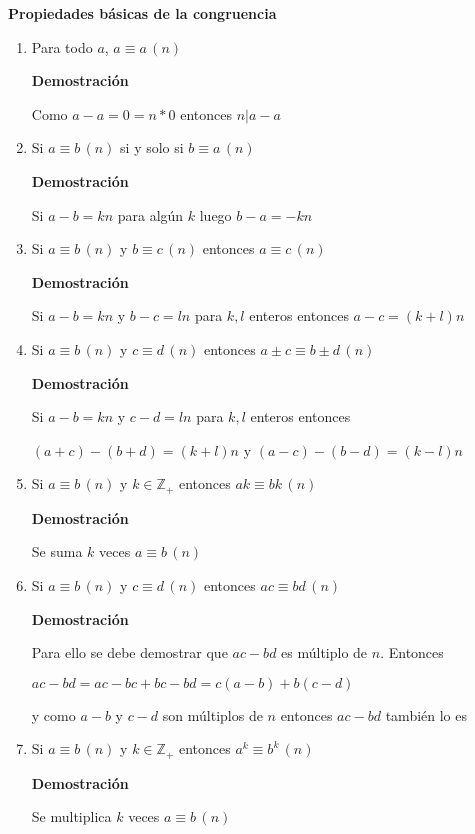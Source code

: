\documentclass[a4paper,12pt]{report}
\begin{document}
\textbf{Propiedades básicas de la congruencia}
\begin{enumerate}
 \item Para todo $a$, $a \equiv a \, (n)$
 
 \textbf{Demostración}
 
 Como $a-a = 0 = n*0$ entonces $n|a-a$
 
 \item Si $a \equiv b \, (n)$ si y solo si $b \equiv a \, (n)$
 
 \textbf{Demostración}
 
 Si $a-b=kn$ para algún $k$ luego $b-a=-kn$
 
 \item Si $a \equiv b \, (n)$ y $b \equiv c \, (n)$ entonces $a \equiv c \, (n)$
 
 \textbf{Demostración}
 
 Si $a-b=kn$ y $b-c=ln$ para $k,l$ enteros entonces $a-c=(k+l)n$
 
 \item Si $a \equiv b \, (n)$ y $c \equiv d \, (n)$ entonces $a\pm c \equiv b\pm d \, (n)$
 
 \textbf{Demostración}
 
 Si $a-b=kn$ y $c-d=ln$ para $k,l$ enteros entonces 
 
 $(a+c)-(b+d)=(k+l)n$ y $(a-c)-(b-d)=(k-l)n$
 
 \item Si $a \equiv b \, (n)$ y $k\in\mathbb{Z}_+$ entonces  $ak \equiv bk \, (n)$
 
 \textbf{Demostración}
 
 Se suma $k$ veces $a \equiv b \, (n)$
 
 \item Si $a \equiv b \, (n)$ y $c \equiv d \, (n)$ entonces $ac \equiv bd \, (n)$
 
 \textbf{Demostración}
 
 Para ello se debe demostrar que $ac - bd$ es múltiplo de $n$. Entonces 
 
 $ac - bd = ac - bc + bc - bd = c(a-b) + b(c-d)$
 
 y como $a-b$ y $c-d$ son múltiplos de $n$ entonces $ac - bd$ también lo es
 
 
 \item Si $a \equiv b \, (n)$ y $k\in\mathbb{Z}_+$ entonces $a^k \equiv b^k \, (n)$
 
  \textbf{Demostración}
 
 Se multiplica $k$ veces $a \equiv b \, (n)$
 

\end{enumerate}
\end{document}
